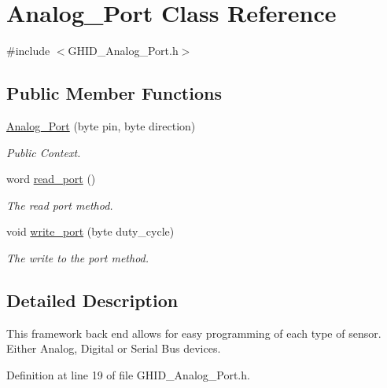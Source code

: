 \hypertarget{class_analog___port}{\section{\-Analog\-\_\-\-Port \-Class \-Reference}
\label{class_analog___port}
}


{\ttfamily \#include $<$\-G\-H\-I\-D\-\_\-\-Analog\-\_\-\-Port.\-h$>$}

\subsection*{\-Public \-Member \-Functions}
\begin{DoxyCompactItemize}
\item 
\hyperlink{class_analog___port_adf978208e03af86c37bdc8ed1ab95d86}{\-Analog\-\_\-\-Port} (byte pin, byte direction)
\begin{DoxyCompactList}\small\item\em \-Public \-Context. \end{DoxyCompactList}\item 
word \hyperlink{class_analog___port_ac349375efb7d9a5ec521e4317c38e0c0}{read\-\_\-port} ()
\begin{DoxyCompactList}\small\item\em \-The read port method. \end{DoxyCompactList}\item 
void \hyperlink{class_analog___port_a58a29fefacb3b340631ff421d34565da}{write\-\_\-port} (byte duty\-\_\-cycle)
\begin{DoxyCompactList}\small\item\em \-The write to the port method. \end{DoxyCompactList}\end{DoxyCompactItemize}


\subsection{\-Detailed \-Description}
\-This framework back end allows for easy programming of each type of sensor. \-Either \-Analog, \-Digital or \-Serial \-Bus devices. 

\-Definition at line 19 of file \-G\-H\-I\-D\-\_\-\-Analog\-\_\-\-Port.\-h.



